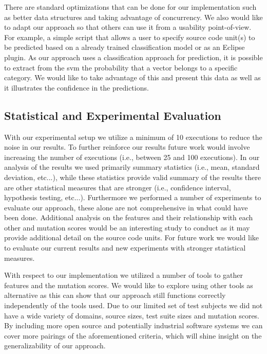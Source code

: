 There are standard optimizations that can be done for our implementation such as better data structures and taking advantage of concurrency. We also would like to adapt our approach so that others can use it from a usability point-of-view. For example, a simple script that allows a user to specify source code unit(s) to be predicted based on a already trained classification model or as an Eclipse plugin. As our approach uses a classification approach for prediction, it is possible to extract from the \gls{svm} the probability that a vector belongs to a specific category. We would like to take advantage of this and present this data as well as it illustrates the confidence in the predictions.


\subsection{Statistical and Experimental Evaluation}
\label{subsec:conclusions_experimental_evaluation}
With our experimental setup we utilize a minimum of 10 executions to reduce the noise in our results. To further reinforce our results future work would involve increasing the number of executions (i.e., between 25 and 100 executions). In our analysis of the results we used primarily summary statistics (i.e., mean, standard deviation, etc...), while these statistics provide valid summary of the results there are other statistical measures that are stronger (i.e., confidence interval, hypothesis testing, etc...). Furthermore we performed a number of experiments to evaluate our approach, these alone are not comprehensive in what could have been done. Additional analysis on the features and their relationship with each other and mutation scores would be an interesting study to conduct as it may provide additional detail on the source code units. For future work we would like to evaluate our current results and new experiments with stronger statistical measures.

With respect to our implementation we utilized a number of tools to gather features and the mutation scores. We would like to explore using other tools as alternative as this can show that our approach still functions correctly independently of the tools used. Due to our limited set of test subjects we did not have a wide variety of domains, source sizes, test suite sizes and mutation scores. By including more open source and potentially industrial software systems we can cover more pairings of the aforementioned criteria, which will shine insight on the generalizability of our approach.


